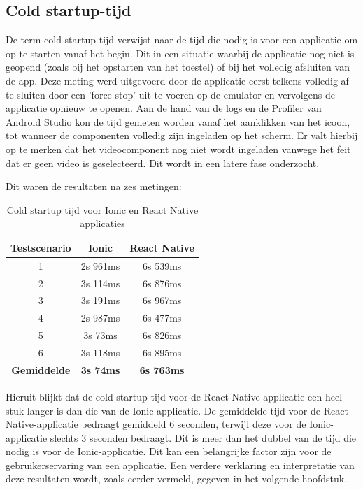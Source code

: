 \subsection{Cold startup-tijd}
\label{subsec:cold-startup-tijd}

De term cold startup-tijd verwijst naar de tijd die nodig is voor een applicatie om op te starten vanaf het begin. Dit in een situatie waarbij de applicatie nog niet is geopend (zoals bij het opstarten van het toestel) of bij het volledig afsluiten van de app. Deze meting werd uitgevoerd door de applicatie eerst telkens volledig af te sluiten door een 'force stop' uit te voeren op de emulator en vervolgens de applicatie opnieuw te openen. Aan de hand van de logs en de Profiler van Android Studio kon de tijd gemeten worden vanaf het aanklikken van het icoon, tot wanneer de componenten volledig zijn ingeladen op het scherm. Er valt hierbij op te merken dat het videocomponent nog niet wordt ingeladen vanwege het feit dat er geen video is geselecteerd. Dit wordt in een latere fase onderzocht.

Dit waren de resultaten na zes metingen:

\begin{table}[htbp]
  \centering
  \begin{tabular}{|c|c|c|}
    \hline
    \textbf{Testscenario} & \textbf{Ionic} & \textbf{React Native} \\
    \hline
    1 & 2s 961ms & 6s 539ms \\
    \hline
    2 & 3s 114ms & 6s 876ms \\
    \hline
    3 & 3s 191ms & 6s 967ms \\
    \hline
    4 & 2s 987ms & 6s 477ms \\
    \hline
    5 & 3s 73ms & 6s 826ms \\
    \hline
    6 & 3s 118ms & 6s 895ms \\
    \hline
    \textbf{Gemiddelde} & \textbf{3s 74ms} & \textbf{6s 763ms} \\
    \hline
  \end{tabular}
  \caption{Cold startup tijd voor Ionic en React Native applicaties}
  \label{tab:cold_startup}
\end{table}

Hieruit blijkt dat de cold startup-tijd voor de React Native applicatie een heel stuk langer is dan die van de Ionic-applicatie. De gemiddelde tijd voor de React Native-applicatie bedraagt gemiddeld 6 seconden, terwijl deze voor de Ionic-applicatie slechts 3 seconden bedraagt. Dit is meer dan het dubbel van de tijd die nodig is voor de Ionic-applicatie. Dit kan een belangrijke factor zijn voor de gebruikerservaring van een applicatie. Een verdere verklaring en interpretatie van deze resultaten wordt, zoals eerder vermeld, gegeven in het volgende hoofdstuk.

